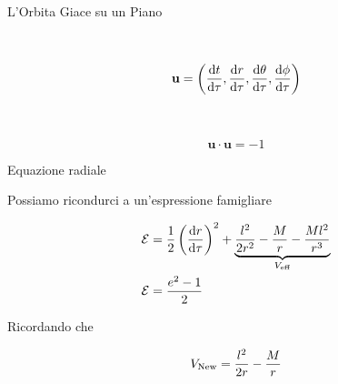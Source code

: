 \begin{frame}{L'Orbita Giace su un Piano}
\begin{minipage}{0.49 \textwidth}
        ~

        \begin{equation*}
            \mathbf{u} = \left( \dv{t}{\tau}, \dv{r}{\tau}, \dv{\theta}{\tau},
            \dv{\phi}{\tau} \right)
        \end{equation*}

        ~

        \begin{equation*}
            \mathbf{u \cdot u} = -1
        \end{equation*}
    \end{minipage}

\end{frame}
 

\begin{frame}{Equazione radiale}

    Possiamo ricondurci a un'espressione famigliare

    \begin{align*}
        \mathcal E &= \frac{1}{2} \left( \dv{r}{\tau} \right)^2
        + \underbrace{\frac{l^2}{2 r^2} - \frac{M}{r} - \frac{M l^2}{r^3}}_{V_{\rm eff}} \\
        \mathcal E &= \frac{e^2 - 1}{2}
    \end{align*}

    Ricordando che 

    \begin{equation*}
        V_{\rm New} = \frac{l^2}{2 r} - \frac{M}{r}
    \end{equation*}

\end{frame}


